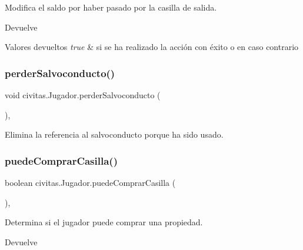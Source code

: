 Modifica el saldo por haber pasado por la casilla de salida. \begin{DoxyReturn}{Devuelve}

\end{DoxyReturn}

\begin{DoxyRetVals}{Valores devueltos}
{\em true} & si se ha realizado la acción con éxito o  en caso contrario \\
\hline
\end{DoxyRetVals}
\mbox{\label{classcivitas_1_1Jugador_a121e27109e4f746fd129175b1622c154}} 
\subsubsection{\texorpdfstring{perder\+Salvoconducto()}{perderSalvoconducto()}}
{\footnotesize\ttfamily void civitas.\+Jugador.\+perder\+Salvoconducto (\begin{DoxyParamCaption}{ }\end{DoxyParamCaption})\hspace{0.3cm}{\ttfamily [inline]}, {\ttfamily [private]}}

Elimina la referencia al salvoconducto porque ha sido usado. \mbox{\label{classcivitas_1_1Jugador_acfcfe8a5b5d26b2293cc727cd27acfac}} 
\subsubsection{\texorpdfstring{puede\+Comprar\+Casilla()}{puedeComprarCasilla()}}
{\footnotesize\ttfamily boolean civitas.\+Jugador.\+puede\+Comprar\+Casilla (\begin{DoxyParamCaption}{ }\end{DoxyParamCaption})\hspace{0.3cm}{\ttfamily [inline]}, {\ttfamily [package]}}

Determina si el jugador puede comprar una propiedad. \begin{DoxyReturn}{Devuelve}

\end{DoxyReturn}

